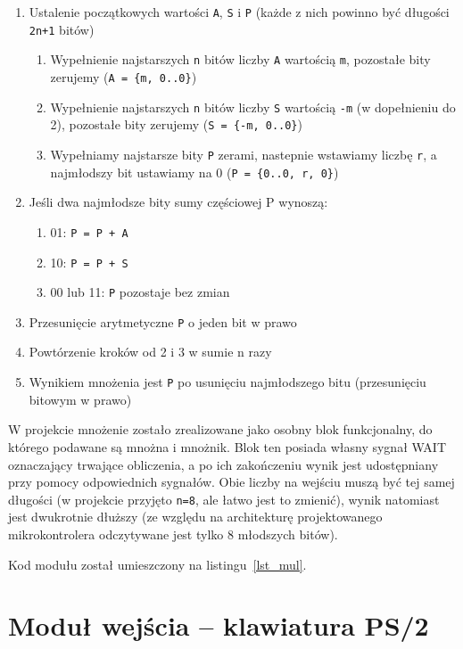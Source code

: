 \documentclass[a4paper,12pt]{report}
\begin{document}
\begin{enumerate}
  \item Ustalenie początkowych wartości \texttt{A}, \texttt{S} i \texttt{P} (każde z nich powinno być długości \texttt{2n+1} bitów)
  \begin{enumerate}
    \item Wypełnienie najstarszych \texttt{n} bitów liczby \texttt{A} wartością \texttt{m}, pozostałe bity zerujemy (\texttt{A = \{m, 0..0\}})
    \item Wypełnienie najstarszych \texttt{n} bitów liczby \texttt{S} wartością \texttt{-m} (w dopełnieniu do 2), pozostałe bity zerujemy (\texttt{S = \{-m, 0..0\}})
    \item Wypełniamy najstarsze bity \texttt{P} zerami, nastepnie wstawiamy liczbę \texttt{r}, a najmłodszy bit ustawiamy na 0 (\texttt{P = \{0..0, r, 0\}})
  \end{enumerate}
  \item Jeśli dwa najmłodsze bity sumy częściowej P wynoszą:
  \begin{enumerate}
    \item 01: \texttt{P = P + A}
    \item 10: \texttt{P = P + S}
    \item 00 lub 11: \texttt{P} pozostaje bez zmian
  \end{enumerate}
  \item Przesunięcie arytmetyczne \texttt{P} o jeden bit w prawo
  \item Powtórzenie kroków od 2 i 3 w sumie n razy
  \item Wynikiem mnożenia jest \texttt{P} po usunięciu najmłodszego bitu (przesunięciu bitowym w prawo)
\end{enumerate}

W projekcie mnożenie zostało zrealizowane jako osobny blok funkcjonalny, do którego podawane są mnożna i mnożnik. Blok ten posiada własny sygnał WAIT oznaczający trwające obliczenia, a po ich zakończeniu wynik jest udostępniany przy pomocy odpowiednich sygnałów. Obie liczby na wejściu muszą być tej samej długości (w projekcie przyjęto \texttt{n=8}, ale łatwo jest to zmienić), wynik natomiast jest dwukrotnie dłuższy (ze względu na architekturę projektowanego mikrokontrolera odczytywane jest tylko 8 młodszych bitów).

Kod modułu został umieszczony na listingu~\ref{lst_mul}.

\section{Moduł wejścia -- klawiatura PS/2}
\end{document}
